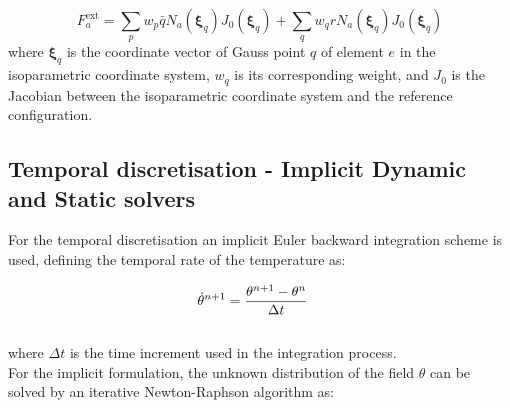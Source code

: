 \documentclass[oneside,11pt,times]{book}
\begin{document}
\begin{equation}
{F}^{\text{ext}}_a=\sum_p w_p\bar{q} N_a(\bm{\xi}_q)J_0(\bm{\xi}_q)+\sum_q w_q r N_a(\bm{\xi}_q)J_0(\bm{\xi}_q)
\label{equationFextElemTheta}
\end{equation}
%
where $\bm{\xi}_q$ is the coordinate vector of Gauss point $q$ of element $e$ in the isoparametric coordinate system, $w_q$ is its corresponding weight, and $J_0$ is the Jacobian between the isoparametric coordinate system and the reference configuration.


\subsection{Temporal discretisation - Implicit Dynamic and Static solvers}

For the temporal discretisation an implicit Euler backward integration scheme is used, defining the temporal rate of the temperature as:

\begin{equation}
\begin{aligned}
\centering
\dot{\theta}^{n+1}&=\dfrac{\theta^{n+1}-\theta^{n}}{\Delta t}
\end{aligned}
\label{equationThetatime}
\end{equation}
\\
where $\Delta t$ is the time increment used in the integration process.\\




For the implicit formulation, the unknown distribution of the field $\theta$ can be solved by an iterative Newton-Raphson algorithm as:
\end{document}
